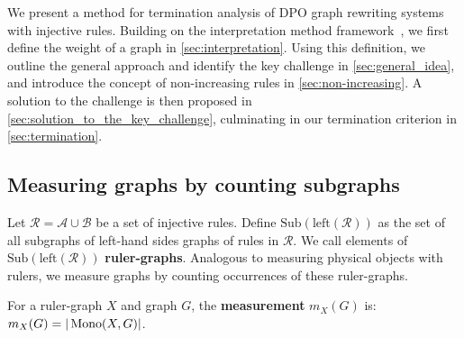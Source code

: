 We present a method for termination analysis of DPO graph rewriting systems with injective rules.
Building on the interpretation method framework~\cite{nipkow1998term}, we first define the weight of a graph in \autoref{sec:interpretation}. 
Using this definition, we outline the general approach and identify the key challenge in \autoref{sec:general_idea}, and introduce the concept of non-increasing rules in \autoref{sec:non-increasing}. 
A solution to the challenge is then proposed in \autoref{sec:solution_to_the_key_challenge}, culminating in our termination criterion in \autoref{sec:termination}.

\subsection{Measuring graphs by counting subgraphs}
\label{sec:interpretation}
Let $\mathcal{R} = \mathcal{A} \cup \mathcal{B}$ be a set of injective rules.
Define $\mathrm{Sub}(\mathrm{left}(\mathcal{R}))$ as the set of all subgraphs of left-hand sides graphs of rules in $\mathcal{R}$.
We call elements of $\mathrm{Sub}(\mathrm{left}(\mathcal{R}))$ \textbf{ruler-graphs}. Analogous to measuring physical objects with rulers, we measure graphs by counting occurrences of these ruler-graphs.

\begin{definition}
    For a ruler-graph \( X \) and graph \( G \), the \textbf{measurement} \( m_X(G) \) is:
    \(
        m_X(G) = |\operatorname{Mono}(X, G)|
    \).
\end{definition} 
 
